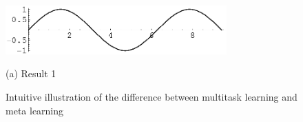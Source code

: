 \begin{figure}[htb]

\begin{minipage}[b]{1.0\linewidth}
  \centering
  \centerline{\includegraphics[width=8.5cm]{image1}}
  \centerline{(a) Result 1}\medskip
\end{minipage}
%
%
\caption{Intuitive illustration of the difference between multitask learning and meta learning}
\label{fig:res}
%
\end{figure}

